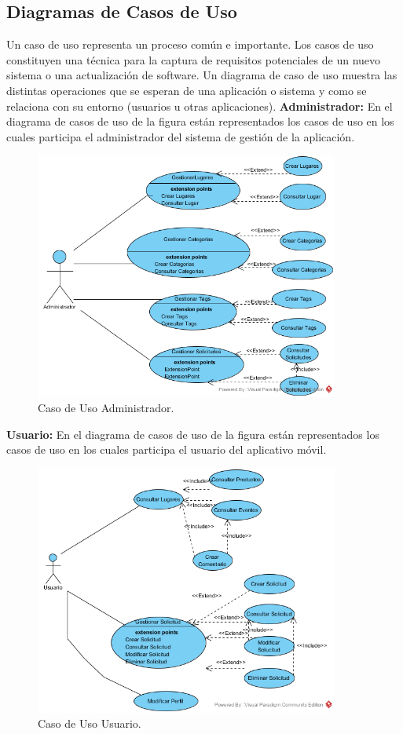 \documentclass[12pt,letterpaper,openany]{book}
\begin{document}
\subsection{Diagramas de Casos de Uso}
Un caso de uso representa un proceso común e importante. Los casos de uso constituyen una técnica para la captura de requisitos potenciales de un nuevo sistema o una actualización de software. Un diagrama de caso de uso muestra las distintas operaciones que se esperan de una aplicación o sistema y como se relaciona con su entorno (usuarios u otras aplicaciones).
\vspace{5mm}\newline
\textbf{Administrador:} En el diagrama de casos de uso de la figura están representados los casos de uso en los cuales participa el administrador del sistema de gestión de la aplicación.
\begin{figure}[H]
\begin{center}
\includegraphics[width=10cm]{./imagenes/CU/cu_administrador}
\caption{Caso de Uso Administrador.}
\end{center}
\end{figure}

\textbf{Usuario:} En el diagrama de casos de uso de la figura están representados los casos de uso en los cuales participa el usuario del aplicativo móvil.
\begin{figure}[H]
\begin{center}
\includegraphics[width=10cm]{./imagenes/CU/cu_usuario}
\caption{Caso de Uso Usuario.}
\end{center}
\end{figure}
\end{document}
